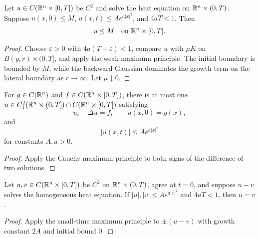 \begin{theorem}
\label{thm:maximum-principle-heat-cauchy-problem-smalltime}




Let $u\in C(\mathbb{R}^n\times[0,T])$ be $C^2$ and solve the heat equation on
$\mathbb{R}^n\times(0,T)$. Suppose $u(x,0)\le M$,
$u(x,t)\le Ae^{a|x|^2}$, and $4aT<1$. Then
$$u\le M\quad\text{on }\mathbb{R}^n\times[0,T].$$
\end{theorem}
\begin{proof}
\sketch Choose $\varepsilon>0$ with $4a(T+\varepsilon)<1$, compare $u$ with
$\mu K$ on $B(y,r)\times(0,T]$, and apply the weak maximum principle. The
initial boundary is bounded by $M$, while the backward Gaussian dominates the
growth term on the lateral boundary as $r\to\infty$. Let $\mu\downarrow0$.
\end{proof}

\begin{theorem}
\label{thm:uniqueness-heat-cauchy-problem}





For $g\in C(\mathbb{R}^n)$ and $f\in C(\mathbb{R}^n\times[0,T])$, there is at most one
$u\in C_1^2(\mathbb{R}^n\times(0,T])\cap C(\mathbb{R}^n\times[0,T])$ satisfying
$$u_t-\Delta u=f,
\qquad
u(x,0)=g(x),$$
and
$$|u(x,t)|\le Ae^{a|x|^2}$$
for constants $A,a>0$.
\end{theorem}
\begin{proof}
\sketch Apply the Cauchy maximum principle to both signs of the difference of
two solutions.
\end{proof}

\begin{theorem}
\label{thm:uniqueness-heat-cauchy-problem-smalltime}




Let $u,v\in C(\mathbb{R}^n\times[0,T])$ be $C^2$ on $\mathbb{R}^n\times(0,T)$, agree at
$t=0$, and suppose $u-v$ solves the homogeneous heat equation. If
$|u|,|v|\le Ae^{a|x|^2}$ and $4aT<1$, then $u=v$.
\end{theorem}
\begin{proof}
\sketch Apply the small-time maximum principle to $\pm(u-v)$ with growth
constant $2A$ and initial bound $0$.
\end{proof}

